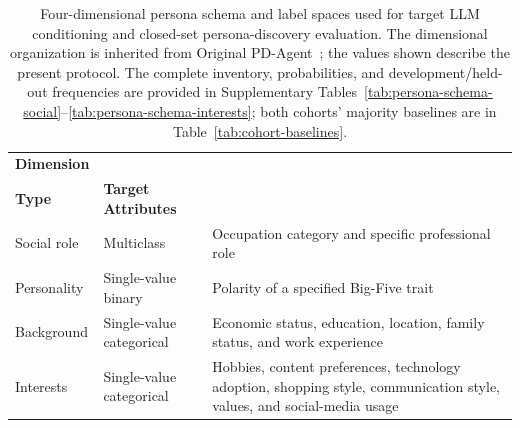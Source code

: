 \documentclass{ieeeaccess}
\begin{document}


\begin{table}[!t]
\centering
\small
\caption{Four-dimensional persona schema and label spaces used for target LLM conditioning and closed-set persona-discovery evaluation. The dimensional organization is inherited from Original PD-Agent~\cite{yang2026pragmatic}; the values shown describe the present protocol. The complete inventory, probabilities, and development/held-out frequencies are provided in Supplementary Tables~\ref{tab:persona-schema-social}--\ref{tab:persona-schema-interests}; both cohorts' majority baselines are in Table~\ref{tab:cohort-baselines}.}
\label{tab:persona_schema}

\setlength{\tabcolsep}{4pt}

\begin{tabularx}{\columnwidth}
{l|p{2.4cm}|>{\raggedright\arraybackslash}X}
\toprule
\textbf{Dimension} &
\makecell{\textbf{Prediction}\\\textbf{Type}} &
\textbf{Target Attributes} \\
\midrule
Social role &
Multiclass &
Occupation category and specific professional role \\

Personality &
Single-value binary &
Polarity of a specified Big-Five trait \\

Background &
Single-value categorical &
Economic status, education, location, family status, and work experience \\

Interests &
Single-value categorical &
Hobbies, content preferences, technology adoption, shopping style, communication style, values, and social-media usage \\
\bottomrule
\end{tabularx}
\end{table}
\end{document}
